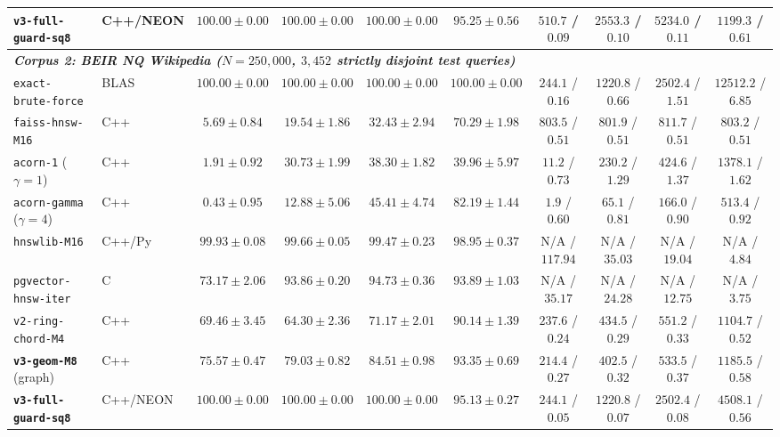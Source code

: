 \documentclass[conference]{IEEEtran}
\begin{document}
\begin{table}[t]
{\begin{tabular}{llcccccccc}
\textbf{\texttt{v3-full-guard-sq8}} & C++/NEON & $\mathbf{100.00 \pm 0.00}$ & $\mathbf{100.00 \pm 0.00}$ & $\mathbf{100.00 \pm 0.00}$ & $95.25 \pm 0.56$ & $510.7$ / $\mathbf{0.09}$ & $2553.3$ / $\mathbf{0.10}$ & $5234.0$ / $\mathbf{0.11}$ & $1199.3$ / $\mathbf{0.61}$ \\
\midrule
\multicolumn{10}{l}{\textit{\textbf{Corpus 2: BEIR NQ Wikipedia ($N=250{,}000$, $3{,}452$ strictly disjoint test queries)}}} \\
\texttt{exact-brute-force} & BLAS & $100.00 \pm 0.00$ & $100.00 \pm 0.00$ & $100.00 \pm 0.00$ & $100.00 \pm 0.00$ & $244.1$ / $0.16$ & $1220.8$ / $0.66$ & $2502.4$ / $1.51$ & $12512.2$ / $6.85$ \\
\texttt{faiss-hnsw-M16} & C++ & $5.69 \pm 0.84$ & $19.54 \pm 1.86$ & $32.43 \pm 2.94$ & $70.29 \pm 1.98$ & $803.5$ / $0.51$ & $801.9$ / $0.51$ & $811.7$ / $0.51$ & $803.2$ / $0.51$ \\
\texttt{acorn-1} ($\gamma{=}1$) & C++ & $1.91 \pm 0.92$ & $30.73 \pm 1.99$ & $38.30 \pm 1.82$ & $39.96 \pm 5.97$ & $11.2$ / $0.73$ & $230.2$ / $1.29$ & $424.6$ / $1.37$ & $1378.1$ / $1.62$ \\
\texttt{acorn-gamma} ($\gamma{=}4$) & C++ & $0.43 \pm 0.95$ & $12.88 \pm 5.06$ & $45.41 \pm 4.74$ & $82.19 \pm 1.44$ & $1.9$ / $0.60$ & $65.1$ / $0.81$ & $166.0$ / $0.90$ & $513.4$ / $0.92$ \\
\texttt{hnswlib-M16} & C++/Py & $99.93 \pm 0.08$ & $99.66 \pm 0.05$ & $99.47 \pm 0.23$ & $\mathbf{98.95 \pm 0.37}$ & N/A / $117.94$ & N/A / $35.03$ & N/A / $19.04$ & N/A / $4.84$ \\
\texttt{pgvector-hnsw-iter} & C & $73.17 \pm 2.06$ & $93.86 \pm 0.20$ & $94.73 \pm 0.36$ & $93.89 \pm 1.03$ & N/A / $35.17$ & N/A / $24.28$ & N/A / $12.75$ & N/A / $3.75$ \\
\texttt{v2-ring-chord-M4} & C++ & $69.46 \pm 3.45$ & $64.30 \pm 2.36$ & $71.17 \pm 2.01$ & $90.14 \pm 1.39$ & $237.6$ / $0.24$ & $434.5$ / $0.29$ & $551.2$ / $0.33$ & $1104.7$ / $0.52$ \\
\textbf{\texttt{v3-geom-M8}} (graph) & C++ & $75.57 \pm 0.47$ & $79.03 \pm 0.82$ & $84.51 \pm 0.98$ & $93.35 \pm 0.69$ & $214.4$ / $0.27$ & $402.5$ / $0.32$ & $533.5$ / $0.37$ & $1185.5$ / $0.58$ \\
\textbf{\texttt{v3-full-guard-sq8}} & C++/NEON & $\mathbf{100.00 \pm 0.00}$ & $\mathbf{100.00 \pm 0.00}$ & $\mathbf{100.00 \pm 0.00}$ & $95.13 \pm 0.27$ & $244.1$ / $\mathbf{0.05}$ & $1220.8$ / $\mathbf{0.07}$ & $2502.4$ / $\mathbf{0.08}$ & $4508.1$ / $\mathbf{0.56}$ \\
\bottomrule
\end{tabular}
}
\end{table}
\end{document}
